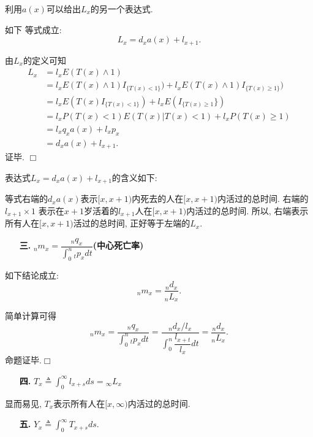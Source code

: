 \documentclass[a4paper,openany, 10pt]{ctexbook}
\newcommand{\hei}{\CJKfamily{hei}}      %
\def\qed{\hfill$\Box$\medskip}
\begin{document}
利用$a(x)$可以给出$L_x$的另一个表达式.
\begin{proposition}如下
    等式成立: $$L_x=d_xa(x)+l_{x+1}.$$
\end{proposition}
\proof 由$L_x$的定义可知
\begin{align*}
    L_x & =l_xE(T(x)\wedge1)                                                     \\
        & =l_xE(T(x)\wedge1)I_{\{T(x)<1\}})+l_xE(T(x)\wedge 1)I_{\{T(x)\ge 1\}}) \\
        & =l_xE(T(x)I_{\{T(x)<1\}})+l_xE(I_{\{T(x)\ge 1}\})                   \\
        & =l_xP(T(x)<1)E(T(x)|T(x)<1)+l_xP(T(x)\ge 1)                            \\
        & =l_xq_xa(x)+l_xp_x                                                     \\
        & =d_xa(x)+l_{x+1}.
\end{align*}
证毕. \qed
\begin{remark}
 表达式$L_x=d_xa(x)+l_{x+1}$的含义如下:

\noindent 等式右端的$d_xa(x)$表示$[x,x+1)$内死去的人在$[x,x+1)$内活过的总时间. 右端的$l_{x+1}\times1$ 表示在$x+1$岁活着的$l_{x+1}$人在$[x,x+1)$内活过的总时间. 所以, 右端表示所有人在$[x,x+1)$活过的总时间, 正好等于左端的$L_x.$
\end{remark}

\begin{itemize}
    \item[{\bf\hei 三.}]{\bf\hei ${}_nm_x=\dfrac {{}_nq_x}{\int_0^n{}_tp_xdt}$(中心死亡率)}
\end{itemize}


\begin{proposition}如下结论成立:
    $${}_nm_x=\dfrac{{}_nd_x}{{}_nL_x}.$$
\end{proposition}
\proof 简单计算可得
$${}_nm_x=\dfrac{{}_nq_x}{\int_0^n{}_tp_xdt}=\dfrac{{}_nd_x/l_x}{\int_0^n\dfrac{l_{x+t}}{l_x}dt}=
    \dfrac{{}_nd_x}{{}_nL_x}.$$命题证毕.\qed

\begin{itemize}
    \item[{\bf\hei 四.}]{\bf\hei $T_x\triangleq\int_0^{\infty}l_{x+s}ds={}_{\infty}L_x$}
\end{itemize}
显而易见, $T_x$表示所有人在$[x,\infty)$内活过的总时间.

\begin{itemize}
    \item[{\bf\hei 五.}]{\bf\hei $Y_x\triangleq\int_0^{\infty}T_{x+s}ds.$}
\end{itemize}
\end{document}
